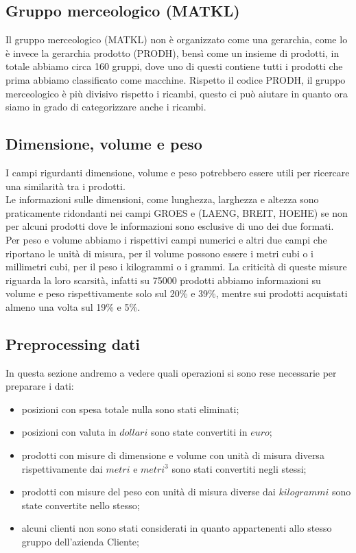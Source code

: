 \subsection{Gruppo merceologico (MATKL)}
Il gruppo merceologico (MATKL) non è organizzato come una gerarchia, come lo è invece la gerarchia prodotto (PRODH), bensì come un insieme di prodotti, in totale abbiamo circa 160 gruppi, dove uno di questi contiene tutti i prodotti che prima abbiamo classificato come macchine. Rispetto il codice PRODH, il gruppo merceologico è più divisivo rispetto i ricambi, questo ci può aiutare in quanto ora siamo in grado di categorizzare anche i ricambi. 

\subsection{Dimensione, volume e peso}
I campi rigurdanti dimensione, volume e peso potrebbero essere utili per ricercare una similarità tra i prodotti.\\
Le informazioni sulle dimensioni, come lunghezza, larghezza e altezza sono praticamente ridondanti nei campi GROES e (LAENG, BREIT, HOEHE) se non per alcuni prodotti dove le informazioni sono esclusive di uno dei due formati.\\
Per peso e volume abbiamo i rispettivi campi numerici e altri due campi che riportano le unità di misura, per il volume possono essere i metri cubi o i millimetri cubi, per il peso i kilogrammi o i grammi.
La criticità di queste misure riguarda la loro scarsità, infatti su 75000 prodotti abbiamo informazioni su volume e peso rispettivamente solo sul 20\% e 39\%, mentre sui prodotti acquistati almeno una volta sul 19\% e 5\%. 

\subsection{Preprocessing dati}
In questa sezione andremo a vedere quali operazioni si sono rese necessarie per preparare i dati:
\begin{itemize}
	\item posizioni con spesa totale nulla sono stati eliminati;
	\item posizioni con valuta in $dollari$ sono state convertiti in $euro$;
	\item prodotti con misure di dimensione e volume con unità di misura diversa rispettivamente dai $metri$ e $metri^3$ sono stati convertiti negli stessi;
	\item prodotti con misure del peso con unità di misura diverse dai $kilogrammi$ sono state convertite nello stesso;
	\item alcuni clienti non sono stati considerati in quanto appartenenti allo stesso gruppo dell'azienda Cliente;
\end{itemize}